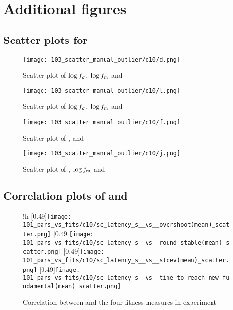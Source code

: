 \chapter{Additional figures}
\label{appendix:figures} %


\section{Scatter plots for \dten}
\begin{figure}
\centering
\texttt{[image: 103\_scatter\_manual\_outlier/d10/d.png]}
\caption{Scatter plot of $\log f_\sigma$, $\log f_\text{m}$ and \timetoreachnewfundamental}
\end{figure}

\begin{figure}
\centering
\texttt{[image: 103\_scatter\_manual\_outlier/d10/l.png]}
\caption{Scatter plot of $\log f_\sigma$, $\log f_\text{m}$ and \overshoot}
\end{figure}

\begin{figure}
\centering
\texttt{[image: 103\_scatter\_manual\_outlier/d10/f.png]}
\caption{Scatter plot of \roundstable, \timetoreachnewfundamental and \stdev}
\end{figure}
\begin{figure}
\centering
\texttt{[image: 103\_scatter\_manual\_outlier/d10/j.png]}
\caption{Scatter plot of \overshoot, $\log f_\text{m}$ and \timetoreachnewfundamental}
\end{figure}

\section{Correlation plots of \sclatencys and \ssmmlatencys}
\begin{figure}{!h}
	\centering
	[0.49\linewidth]{\texttt{[image: 101\_pars\_vs\_fits/d10/sc\_latency\_s\_\_vs\_\_overshoot(mean)\_scatter.png]}}
	[0.49\linewidth]{\texttt{[image: 101\_pars\_vs\_fits/d10/sc\_latency\_s\_\_vs\_\_round\_stable(mean)\_scatter.png]}}
	[0.49\linewidth]{\texttt{[image: 101\_pars\_vs\_fits/d10/sc\_latency\_s\_\_vs\_\_stdev(mean)\_scatter.png]}}
	[0.49\linewidth]{\texttt{[image: 101\_pars\_vs\_fits/d10/sc\_latency\_s\_\_vs\_\_time\_to\_reach\_new\_fundamental(mean)\_scatter.png]}}
	\caption{Correlation between \sclatencys{} and the four fitness measures in experiment \dten}

\end{figure}

